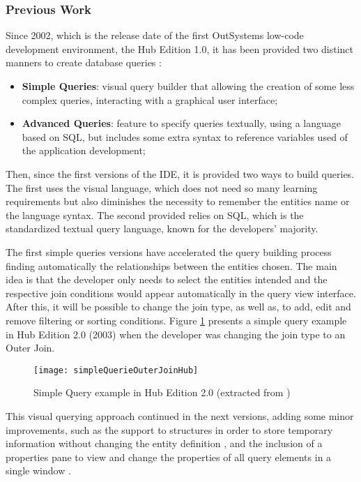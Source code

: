 \subsubsection{Previous Work}
\label{subsubsec:previous_work}

Since 2002, which is the release date of the first OutSystems low-code development environment, the Hub Edition 1.0, it has been provided two distinct manners to create database queries \cite{whatsNotNewInOutsystems}:

\begin{itemize}
	\item \textbf{Simple Queries}: visual query builder that allowing the creation of some less complex queries, interacting with a graphical user interface;
	\item \textbf{Advanced Queries}: feature to specify queries textually, using a language based on SQL, but includes some extra syntax to reference variables used of the application development;
\end{itemize}

Then, since the first versions of the IDE, it is provided two ways to build queries. The first uses the visual language, which does not need so many learning requirements but also diminishes the necessity to remember the entities name or the language syntax. The second provided relies on SQL, which is the standardized textual query language, known for the developers' majority.

The first simple queries versions have accelerated the query building process finding automatically the relationships between the entities chosen. The main idea is that the developer only needs to select the entities intended and the respective join conditions would appear automatically in the query view interface. After this, it will be possible to change the join type, as well as, to add, edit and remove filtering or sorting conditions. Figure \ref{fig:ss_simpleQuerieOuterJoinHub2} presents a simple query example in Hub Edition 2.0 (2003) when the developer was changing the join type to an Outer Join.

\begin{figure}[htbp]
	\centering
	\texttt{[image: simpleQuerieOuterJoinHub]}
	\caption{Simple Query example in Hub Edition 2.0 (extracted from \cite{whatsNewHub2})}
	\label{fig:ss_simpleQuerieOuterJoinHub2}
\end{figure}

This visual querying approach continued in the next versions, adding some minor improvements, such as the support to structures in order to store temporary information without changing the entity definition \cite{whatsNewHub22}, and the inclusion of a properties pane to view and change the properties of all query elements in a single window \cite{agilePlatform5}.

